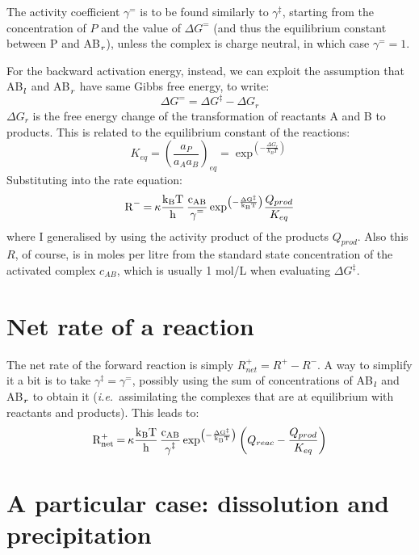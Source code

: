 \documentclass[12pt]{paper}    %
\newcommand{\ie}{\textit{i.e.}~}
\begin{document}
The activity coefficient $\gamma^=$ is to be found similarly to $\gamma^\ddag$, starting from the concentration of $P$ and the value of $\Delta G^=$ (and thus the equilibrium constant between P and AB$\ce{_r}$), unless the complex is charge neutral, in which case $\gamma^= = 1$.

For the backward activation energy, instead, we can exploit the assumption that AB$\ce{_l}$ and AB$\ce{_r}$ have same Gibbs free energy, to write:
%
\begin{equation}
\Delta G^= = \Delta G^\ddag - \Delta G_r
\end{equation}
%
$\Delta G_r$ is the free energy change of the transformation of reactants A and B to products. This is related to the equilibrium constant of the reactions:
%
\begin{equation}
K_{eq} = \left(\frac{a_P}{a_Aa_B}\right)_{eq} = \exp^{\left(-\frac{\Delta G_r}{k_BT}\right)}
\end{equation}
%
Substituting into the rate equation:
%
\begin{equation}
\ce{R- =  \kappa \frac{k_BT}{h} \frac{c_{AB}}{\gamma^=} exp^{\left( -\frac{\Delta G^\ddag}{k_BT}\right)}} \frac{Q_{prod}}{K_{eq}}   \label{eqRm}
\end{equation}
%
where I generalised by using the activity product of the products $Q_{prod}$. Also this $R$, of course, is in moles per litre from the standard state concentration of the activated complex $c_{AB}$, which is usually 1 mol/L when evaluating $\Delta G^\ddag$.


\section{Net rate of a reaction} 

The net rate of the forward reaction is simply $R^+_{net} = R^+ - R^-$. A way to simplify it a bit is to take $\gamma^\ddag = \gamma^=$, possibly using the sum of concentrations of AB$\ce{_l}$ and AB$\ce{_r}$ to obtain it (\ie assimilating the complexes that are at equilibrium with reactants and products). This leads to:
%
\begin{equation}
\ce{R^+_{net} =  \kappa \frac{k_BT}{h} \frac{c_{AB}}{\gamma^\ddag} exp^{\left( -\frac{\Delta G^\ddag}{k_BT}\right)}} \left(Q_{reac} -\frac{Q_{prod}}{K_{eq}} \right)
\end{equation}
%



\section{A particular case: dissolution and precipitation}
\end{document}
